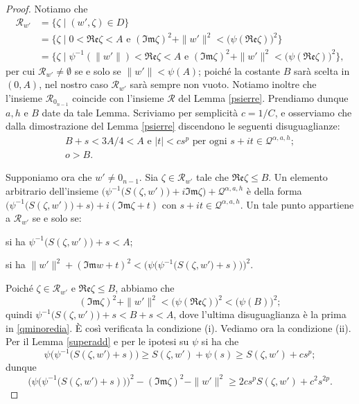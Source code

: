 \begin{proof}
    Notiamo che
    \begin{align*}
        \mathcal{R}_{w'}&=\{\zeta\mid (w',\zeta)\in D\}\\
        &=\{\zeta\mid0<\mathfrak{Re}\zeta<A\text{ e }(\mathfrak{Im}\zeta)^2+\|w'\|^2<\big(\psi(\mathfrak{Re}\zeta)\big)^2\}\\
        &=\{\zeta\mid \psi^{-1}(\|w'\|)<\mathfrak{Re}\zeta<A\text{ e }(\mathfrak{Im}\zeta)^2+\|w'\|^2<\big(\psi(\mathfrak{Re}\zeta)\big)^2\},
    \end{align*}
    per cui $\mathcal{R}_{w'}\not=\emptyset$ se e solo se $\|w'\|<\psi(A)$; poiché la costante $B$ sarà scelta in $(0,A)$, nel nostro caso $\mathcal{R}_{w'}$ sarà sempre non vuoto. Notiamo inoltre che l'insieme $\mathcal{R}_{0_{n-1}}$ coincide con l'insieme $\mathcal{R}$ del Lemma \ref{psierre}. Prendiamo dunque $a,h$ e $B$ date da tale Lemma. Scriviamo per semplicità $c=1/C$, e osserviamo che dalla dimostrazione del Lemma \ref{psierre} discendono le seguenti disuguaglianze:
    \begin{gather}
        B+s<3A/4<A\text{ e }|t|<cs^p\text{ per ogni }s+it\in\mathcal{Q}^{\alpha,a,h};\label{qminoredia}\\
        o>B.\label{obbi}
    \end{gather}

    Supponiamo ora che $w'\not=0_{n-1}$. Sia $\zeta\in\mathcal{R}_{w'}$ tale che $\mathfrak{Re}\zeta\le B$. Un elemento arbitrario dell'insieme $\Big(\psi^{-1}\big(S(\zeta,w')\big)+i\mathfrak{Im}\zeta\Big)+\mathcal{Q}^{\alpha,a,h}$ è della forma $\Big(\psi^{-1}\big(S(\zeta,w')\big)+s\Big)+i(\mathfrak{Im}\zeta+t)$ con $s+it\in\mathcal{Q}^{\alpha,a,h}$. Un tale punto appartiene a $\mathcal{R}_{w'}$ se e solo se:
    \begin{nlist}
        \item si ha $\psi^{-1}\big(S(\zeta,w')\big)+s<A$;
        \item si ha $\|w'\|^2+(\mathfrak{Im}w+t)^2<\bigg(\psi\Big(\psi^{-1}\big(S(\zeta,w'\big)+s)\Big)\bigg)^2$.
    \end{nlist}

    Poiché $\zeta\in\mathcal{R}_{w'}$ e $\mathfrak{Re}\zeta\le B$, abbiamo che
    $$(\mathfrak{Im}\zeta)^2+\|w'\|^2<\big(\psi(\mathfrak{Re}\zeta)\big)^2<\big(\psi(B)\big)^2;$$
    quindi $\psi^{-1}\big(S(\zeta,w')\big)+s<B+s<A$, dove l'ultima disuguaglianza è la prima in \eqref{qminoredia}. È così verificata la condizione (i). Vediamo ora la condizione (ii). Per il Lemma \ref{superadd} e per le ipotesi su $\psi$ si ha che
    $$\psi\Big(\psi^{-1}\big(S(\zeta,w'\big)+s)\Big)\ge S(\zeta,w')+\psi(s) \ge S(\zeta,w')+cs^p;$$
    dunque
    $$\bigg(\psi\Big(\psi^{-1}\big(S(\zeta,w'\big)+s)\Big)\bigg)^2-(\mathfrak{Im}\zeta)^2-\|w'\|^2\ge 2cs^pS(\zeta,w')+c^2s^{2p}.$$


\end{proof}
